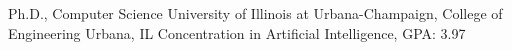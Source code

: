 
        {Ph.D., Computer Science}
        {University of Illinois at Urbana-Champaign, College of Engineering}
        {Urbana, IL}
        {Concentration in Artificial Intelligence, GPA: 3.97}
        {}